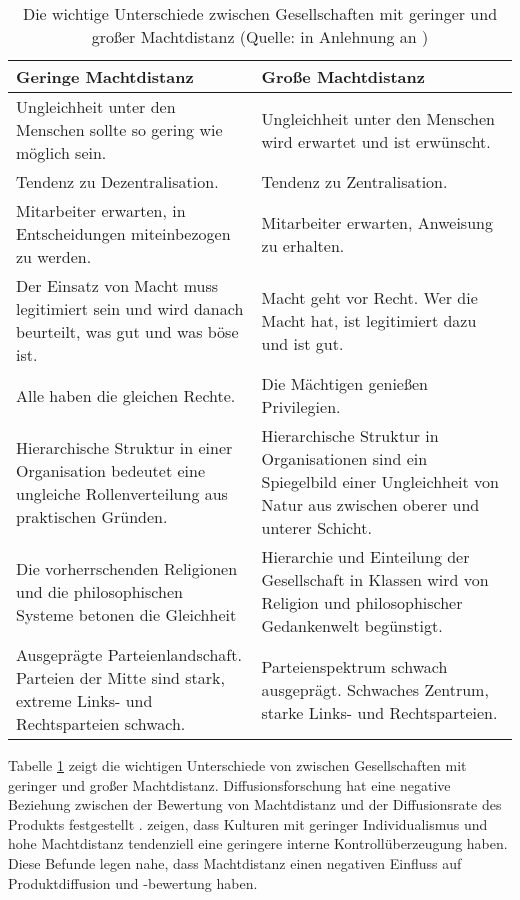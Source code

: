 \begin{table}[htb]
    \centering
    \begin{tabularx}{\textwidth}{X X}
        \hline
        Geringe Machtdistanz     & Große Machtdistanz     \\ \hline
        Ungleichheit unter den Menschen sollte so gering wie möglich sein.         & Ungleichheit unter den Menschen wird erwartet und ist erwünscht.            \\ \hline
        Tendenz zu Dezentralisation.         & Tendenz zu Zentralisation.             \\ \hline
	Mitarbeiter erwarten, in Entscheidungen miteinbezogen zu werden. & Mitarbeiter erwarten, Anweisung zu erhalten. \\ \hline
	Der Einsatz von Macht muss legitimiert sein und wird danach beurteilt, was gut und was böse ist. & Macht geht vor Recht. Wer die Macht hat, ist legitimiert dazu und ist gut. \\ \hline
	Alle haben die gleichen Rechte. & Die Mächtigen genießen Privilegien. \\ \hline
	Hierarchische Struktur in einer Organisation bedeutet eine ungleiche Rollenverteilung aus praktischen Gründen. & Hierarchische Struktur in Organisationen sind ein Spiegelbild einer Ungleichheit von Natur aus zwischen oberer und unterer Schicht. \\ \hline
	Die vorherrschenden Religionen und die philosophischen Systeme betonen die Gleichheit & Hierarchie und Einteilung der Gesellschaft in Klassen wird von Religion und philosophischer Gedankenwelt begünstigt. \\ \hline
	Ausgeprägte Parteienlandschaft. Parteien der Mitte sind stark, extreme Links- und Rechtsparteien schwach. & Parteienspektrum schwach ausgeprägt. Schwaches Zentrum, starke Links- und Rechtsparteien. \\ \hline
    \end{tabularx}
	\caption[Die wichtige Unterschiede zwischen Gesellschaften mit geringer und großer Machtdistanz]{Die wichtige Unterschiede zwischen Gesellschaften mit geringer und großer Machtdistanz (Quelle: in Anlehnung an \citealp[p. ~52, 57]{hofstede2013interkulturelle})}
	\label{tab:machtdistanz}
\end{table}

Tabelle \ref{tab:machtdistanz} zeigt die wichtigen Unterschiede von \citeauthor{hofstede2013interkulturelle} zwischen Gesellschaften mit geringer und großer Machtdistanz. Diffusionsforschung hat eine negative Beziehung zwischen der Bewertung von Machtdistanz und der Diffusionsrate des Produkts festgestellt \citep{van2003effect, yeniyurt2003does}. \citet{smith1995rotter} zeigen, dass Kulturen mit geringer Individualismus und hohe Machtdistanz tendenziell eine geringere interne Kontrollüberzeugung haben. Diese Befunde legen nahe, dass Machtdistanz einen negativen Einfluss auf Produktdiffusion und -bewertung haben.

